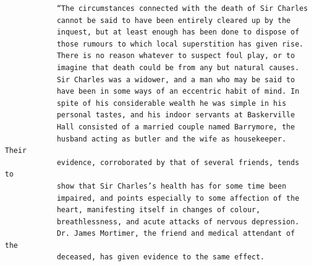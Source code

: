 \documentclass{article}
\begin{document}
\begin{verbatim}
            “The circumstances connected with the death of Sir Charles
            cannot be said to have been entirely cleared up by the
            inquest, but at least enough has been done to dispose of
            those rumours to which local superstition has given rise.
            There is no reason whatever to suspect foul play, or to
            imagine that death could be from any but natural causes.
            Sir Charles was a widower, and a man who may be said to
            have been in some ways of an eccentric habit of mind. In
            spite of his considerable wealth he was simple in his
            personal tastes, and his indoor servants at Baskerville
            Hall consisted of a married couple named Barrymore, the
            husband acting as butler and the wife as housekeeper. Their
            evidence, corroborated by that of several friends, tends to
            show that Sir Charles’s health has for some time been
            impaired, and points especially to some affection of the
            heart, manifesting itself in changes of colour,
            breathlessness, and acute attacks of nervous depression.
            Dr. James Mortimer, the friend and medical attendant of the
            deceased, has given evidence to the same effect.


\end{verbatim}
\end{document}

